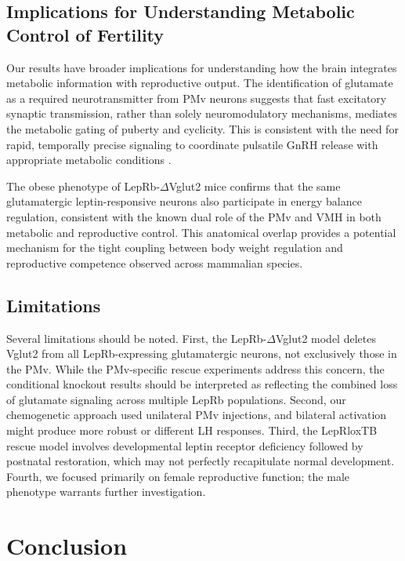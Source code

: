 \documentclass[12pt]{article}
\begin{document}
\subsection{Implications for Understanding Metabolic Control of Fertility}

Our results have broader implications for understanding how the brain integrates metabolic information with reproductive output. The identification of glutamate as a required neurotransmitter from PMv neurons suggests that fast excitatory synaptic transmission, rather than solely neuromodulatory mechanisms, mediates the metabolic gating of puberty and cyclicity. This is consistent with the need for rapid, temporally precise signaling to coordinate pulsatile GnRH release with appropriate metabolic conditions \citep{elias2012leptin, clarke2015effects}.

The obese phenotype of LepRb-$\Delta$Vglut2 mice confirms that the same glutamatergic leptin-responsive neurons also participate in energy balance regulation, consistent with the known dual role of the PMv and VMH in both metabolic and reproductive control. This anatomical overlap provides a potential mechanism for the tight coupling between body weight regulation and reproductive competence observed across mammalian species.

\subsection{Limitations}

Several limitations should be noted. First, the LepRb-$\Delta$Vglut2 model deletes Vglut2 from all LepRb-expressing glutamatergic neurons, not exclusively those in the PMv. While the PMv-specific rescue experiments address this concern, the conditional knockout results should be interpreted as reflecting the combined loss of glutamate signaling across multiple LepRb populations. Second, our chemogenetic approach used unilateral PMv injections, and bilateral activation might produce more robust or different LH responses. Third, the LepRloxTB rescue model involves developmental leptin receptor deficiency followed by postnatal restoration, which may not perfectly recapitulate normal development. Fourth, we focused primarily on female reproductive function; the male phenotype warrants further investigation.

\section{Conclusion}
\end{document}
